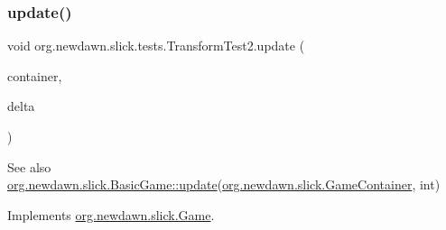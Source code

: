 \subsubsection{\texorpdfstring{update()}{update()}}
{\footnotesize\ttfamily void org.\+newdawn.\+slick.\+tests.\+Transform\+Test2.\+update (\begin{DoxyParamCaption}\item[{\mbox{\hyperlink{classorg_1_1newdawn_1_1slick_1_1_game_container}{Game\+Container}}}]{container,  }\item[{int}]{delta }\end{DoxyParamCaption})\hspace{0.3cm}{\ttfamily [inline]}}

\begin{DoxySeeAlso}{See also}
\mbox{\hyperlink{classorg_1_1newdawn_1_1slick_1_1_basic_game_acfe6fa05aef83bff1631af91a3e4bd20}{org.\+newdawn.\+slick.\+Basic\+Game\+::update}}(\mbox{\hyperlink{classorg_1_1newdawn_1_1slick_1_1_game_container}{org.\+newdawn.\+slick.\+Game\+Container}}, int) 
\end{DoxySeeAlso}


Implements \mbox{\hyperlink{interfaceorg_1_1newdawn_1_1slick_1_1_game_ab07b2e9463ee4631620dde0de25bdee8}{org.\+newdawn.\+slick.\+Game}}.


